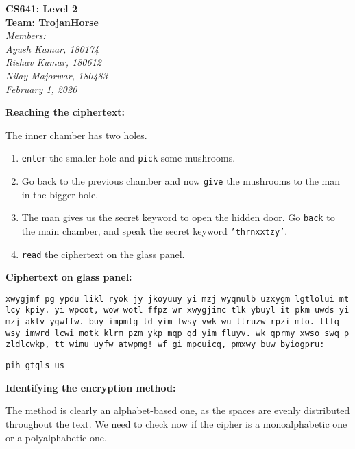 \documentclass[11pt]{article}
\begin{document}
\begin{center}
  \Large\textbf{CS641: Level 2}\\
  \Large\textbf{Team: TrojanHorse}\\
  \medskip
  \large\textit{Members:\quad}\\
  \large\textit{Ayush Kumar, 180174\quad}\\
  \large\textit{Rishav Kumar, 180612\quad}\\
  \large\textit{Nilay Majorwar, 180483\quad}\\
  \medskip
  \large\textit{February 1, 2020\quad}
\end{center}

\bigskip
\bigskip

\textbf{Reaching the ciphertext: }
\medskip

The inner chamber has two holes.
\begin{enumerate}
  \item \texttt{enter} the smaller hole and \texttt{pick} some mushrooms.
  \item Go back to the previous chamber and now \texttt{give} the mushrooms to the man in the bigger hole.
  \item The man gives us the secret keyword to open the hidden door. Go \texttt{back} to the main chamber, and speak the secret keyword \texttt{'thrnxxtzy'}.
  \item \texttt{read} the ciphertext on the glass panel.
\end{enumerate}

\bigskip
\bigskip

\textbf{Ciphertext on glass panel: }

\begin{center}
  \texttt{xwygjmf pg ypdu likl ryok jy jkoyuuy yi mzj wyqnulb uzxygm lgtlolui mt lcy kpiy. yi wpcot, wow wotl ffpz wr xwygjimc tlk ybuyl it pkm uwds yi mzj aklv ygwffw. buy impmlg ld yim fwsy vwk wu ltruzw rpzi mlo. tlfq wsy imwrd lcwi motk klrm pzm ykp mqp qd yim fluyv. wk qprmy xwso swq p zldlcwkp, tt wimu uyfw atwpmg! wf gi mpcuicq, pmxwy buw byiogpru:}
  \medskip

  \texttt{pih\_gtqls\_us}
\end{center}

\bigskip
\bigskip

\textbf{Identifying the encryption method: }
\medskip

The method is clearly an alphabet-based one, as the spaces are evenly distributed throughout the text. We need to check now if the cipher is a monoalphabetic one or a polyalphabetic one.
\medskip
\end{document}
